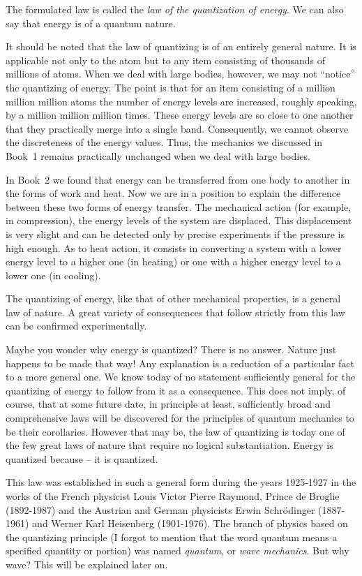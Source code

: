 The formulated law is called the \emph{law of the quantization of energy}. We can also say that energy is of a quantum nature.

It should be noted that the law of quantizing is of an entirely general nature. It is applicable not only to the atom but to any item consisting of thousands of millions of atoms. When we deal with large bodies, however, we may not ``notice'' the quantizing of energy. The point is that for an item consisting of a million million million atoms the number of energy levels are increased, roughly speaking, by a million million million times. These energy levels are so close to one another that they practically merge into a single band. Consequently, we cannot observe the discreteness of the energy values. Thus, the mechanics we discussed in Book~1 remains practically unchanged when we deal with large bodies.

In Book~2 we found that energy can be transferred from one body to another in the forms of work and heat. Now we are in a position to explain the difference between these two forms of energy transfer. The mechanical action (for example, in compression), the energy levels of the system are displaced. This displacement is very slight and can be detected only by precise experiments if the pressure is high enough. As to heat action, it consists in converting a system with a lower energy level to a higher one (in heating) or one with a higher energy level to a lower one (in cooling).

The quantizing of energy, like that of other mechanical properties, is a general law of nature. A great variety of consequences that follow strictly from this law can be confirmed experimentally.

Maybe you wonder why energy is quantized? There is no answer. Nature just happens to be made that way! Any explanation is a reduction of a particular fact to a more general one. We know today of no statement sufficiently general for the quantizing of energy to follow from it as a consequence. This does not imply, of course, that at some future date, in principle at least, sufficiently broad and comprehensive laws will be discovered for the principles of quantum mechanics to be their corollaries. However that may be, the law of quantizing is today one of the few great laws of nature that require no logical substantiation. Energy is quantized because -- it is quantized.

This law was established in such a general form during the years 1925-1927 in the works of the French physicist Louis Victor Pierre Raymond, Prince de Broglie (1892-1987) and the Austrian and German physicists Erwin Schr\"odinger (1887-1961) and Werner Karl Heisenberg (1901-1976). The branch of physics based on the quantizing principle (I forgot to mention that the word quantum means a specified quantity or portion) was named \emph{quantum}, or \emph{wave mechanics}. But why wave? This will be explained later on.

